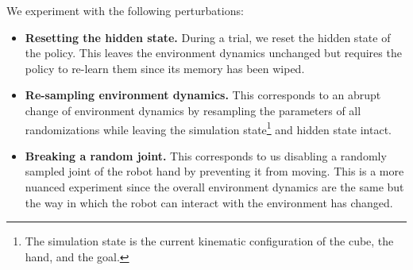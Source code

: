 We experiment with the following perturbations:
\begin{itemize}
    \item \textbf{Resetting the hidden state.} During a trial, we reset the hidden state of the policy. This leaves the environment dynamics unchanged but requires the policy to re-learn them since its memory has been wiped.
    \item \textbf{Re-sampling environment dynamics.} This corresponds to an abrupt change of environment dynamics by resampling the parameters of all randomizations while leaving the simulation state\footnote{The simulation state is the current kinematic configuration of the cube, the hand, and the goal.} and hidden state intact.
    \item \textbf{Breaking a random joint.} This corresponds to us disabling a randomly sampled joint of the robot hand by preventing it from moving. This is a more nuanced experiment since the overall environment dynamics are the same but the way in which the robot can interact with the environment has changed.
\end{itemize}

